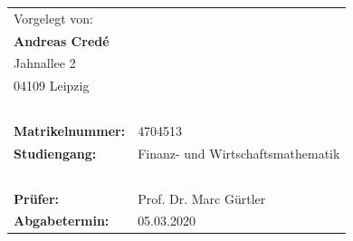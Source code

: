 \documentclass[
	a4paper,
	12pt,
	bibliography=totocnumbered,
	twoside,
]{scrreprt}
\begin{document}
\vspace{\fill}


\begin{tabular}{ll}
	\multicolumn{2}{l}{Vorgelegt von:} \\
	\multicolumn{2}{l}{\textbf{Andreas Credé}} \\
	\multicolumn{2}{l}{Jahnallee 2} \\
	\multicolumn{2}{l}{04109 Leipzig} \\
	\ & \ \\
	\textbf{Matrikelnummer:} & 4704513 \\
	\textbf{Studiengang:} & Finanz- und Wirtschaftsmathematik \\
	\ & \ \\
	\textbf{Prüfer:} & Prof. Dr. Marc Gürtler \\
	\textbf{Abgabetermin:} & 05.03.2020 \\
\end{tabular}




\thispagestyle{empty}







\newpage
\null
\thispagestyle{empty}
\newpage






\end{document}

